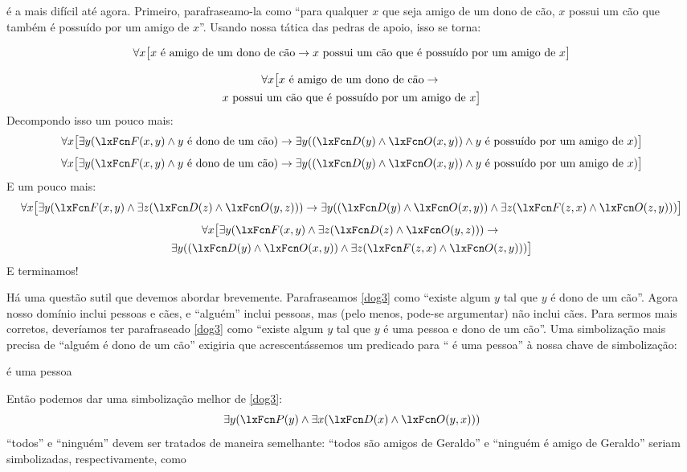  é a mais difícil até agora. Primeiro, parafraseamo-la como
\textquotedblleft para qualquer $x$ que seja amigo de um dono de cão, $x$ possui um cão que também é possuído por um amigo de $x$\textquotedblright{}. Usando nossa tática das pedras de apoio, isso se torna:


\ifHTMLtarget
\[\forall x\bigl[x\text{ é amigo de um dono de cão}\rightarrow x\text{ possui um cão que é possuído por um amigo de }x\bigr]\]

\else
\begin{multline*}
\forall x\bigl[x\text{ é amigo de um dono de cão}\rightarrow {}\\
x\text{ possui um cão que é possuído por um amigo de }x\bigr]
\end{multline*}
\fi
Decompondo isso um pouco mais:
\ifHTMLtarget
\[\forall x\bigl[\exists y(\atom{F}{x,y} \eand y\text{ é dono de um cão})\eif
\exists y((\atom{D}{y} \eand \atom{O}{x,y}) \eand y\text{ é possuído por
um amigo de }x)\bigr]\]
\else
\begin{multline*}
\forall x\bigl[\exists y(\atom{F}{x,y} \eand y\text{ é dono de um cão})\eif {}
\exists y((\atom{D}{y} \eand \atom{O}{x,y}) \eand y\text{ é possuído por um amigo de }x)\bigr]
\end{multline*}
\fi
E um pouco mais:
\ifHTMLtarget
\[\forall x\bigl[\exists y(\atom{F}{x,y} \eand \exists z(\atom{D}{z} \eand \atom{O}{y,z})) \eif
\exists y((\atom{D}{y} \eand \atom{O}{x,y}) \eand \exists z(\atom{F}{z,x} \eand \atom{O}{z,y}))\bigr]\]
\else
\begin{multline*}
\forall x\bigl[\exists y(\atom{F}{x,y} \eand \exists z(\atom{D}{z} \eand \atom{O}{y,z})) \eif {}\\
\exists y((\atom{D}{y} \eand \atom{O}{x,y}) \eand \exists z(\atom{F}{z,x} \eand \atom{O}{z,y}))\bigr]
\end{multline*}
\fi
E terminamos!

Há uma questão sutil que devemos abordar brevemente. Parafraseamos
\cref{dog3} como \textquotedblleft existe algum $y$ tal que $y$ é dono de um cão\textquotedblright{}.
Agora nosso domínio inclui pessoas e cães, e \textquotedblleft alguém\textquotedblright{} inclui
pessoas, mas (pelo menos, pode-se argumentar) não inclui cães. Para sermos
mais corretos, deveríamos ter parafraseado \cref*{dog3} como \textquotedblleft existe
algum $y$ tal que $y$ é uma pessoa e dono de um cão\textquotedblright{}. Uma
simbolização mais precisa de \textquotedblleft alguém é dono de um cão\textquotedblright{} exigiria que acrescentássemos um
predicado para \textquotedblleft \blank{} é uma pessoa\textquotedblright{} à nossa chave de simbolização:
\begin{ekey}
\item[\atom{P}{x}]  é uma pessoa
\end{ekey}
Então podemos dar uma simbolização melhor de \cref{dog3}:
$$\exists y (\atom{P}{y} \eand \exists x(\atom{D}{x} \eand
\atom{O}{y,x}))$$
\textquotedblleft todos\textquotedblright{} e \textquotedblleft ninguém\textquotedblright{} devem ser tratados de maneira semelhante: \textquotedblleft todos são amigos de Geraldo\textquotedblright{} e \textquotedblleft ninguém é amigo de Geraldo\textquotedblright{} seriam simbolizadas, respectivamente, como


